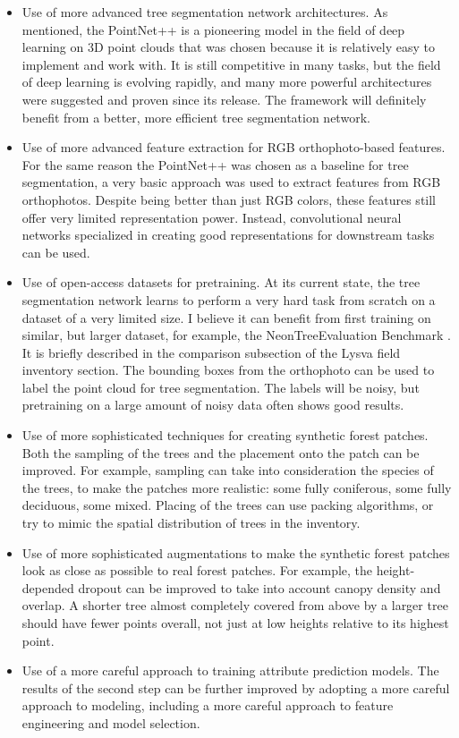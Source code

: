 \begin{itemize}
\item Use of more advanced tree segmentation network architectures.
  As mentioned, the PointNet++ is a pioneering model in the field of deep learning on 3D point clouds that was chosen because it is relatively easy to implement and work with.
  It is still competitive in many tasks, but the field of deep learning is evolving rapidly, and many more powerful architectures were suggested and proven since its release.
  The framework will definitely benefit from a better, more efficient tree segmentation network.
\item Use of more advanced feature extraction for RGB orthophoto-based features.
  For the same reason the PointNet++ was chosen as a baseline for tree segmentation, a very basic approach was used to extract features from RGB orthophotos.
  Despite being better than just RGB colors, these features still offer very limited representation power.
  Instead, convolutional neural networks specialized in creating good representations for downstream tasks can be used.
\item Use of open-access datasets for pretraining.
  At its current state, the tree segmentation network learns to perform a very hard task from scratch on a dataset of a very limited size.
  I believe it can benefit from first training on similar, but larger dataset, for example, the NeonTreeEvaluation Benchmark \citep{weinsteinDataNeonTreeEvaluationBenchmark2022}.
  It is briefly described in the comparison subsection of the Lysva field inventory section.
  The bounding boxes from the orthophoto can be used to label the point cloud for tree segmentation.
  The labels will be noisy, but pretraining on a large amount of noisy data often shows good results.
\item Use of more sophisticated techniques for creating synthetic forest patches.
  Both the sampling of the trees and the placement onto the patch can be improved.
  For example, sampling can take into consideration the species of the trees, to make the patches more realistic: some fully coniferous, some fully deciduous, some mixed.
  Placing of the trees can use packing algorithms, or try to mimic the spatial distribution of trees in the inventory.
\item Use of more sophisticated augmentations to make the synthetic forest patches look as close as possible to real forest patches.
  For example, the height-depended dropout can be improved to take into account canopy density and overlap.
  A shorter tree almost completely covered from above by a larger tree should have fewer points overall, not just at low heights relative to its highest point.
\item Use of a more careful approach to training attribute prediction models.
The results of the second step can be further improved by adopting a more careful approach to modeling, including a more careful approach to feature engineering and model selection.

\end{itemize}

